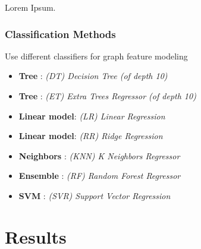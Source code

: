 \documentclass{article} %
\begin{document}
Lorem Ipsum.

\subsubsection{Classification Methods}

Use different classifiers for graph feature modeling


\begin{itemize}
	\item \textbf{Tree} \hspace{3.5pc}: \textit{(DT) Decision Tree (of depth 10)}
	\item \textbf{Tree} \hspace{3.5pc}: \textit{(ET) Extra Trees Regressor (of depth 10)}
 	\item \textbf{Linear model}\hspace{0.5pc}: \textit{(LR) Linear Regression}
	\item \textbf{Linear model}\hspace{0.5pc}: \textit{(RR) Ridge Regression}
	\item \textbf{Neighbors} \hspace{1.125pc} : \textit{(KNN) K Neighbors Regressor}
	\item \textbf{Ensemble}\hspace{1.5pc} : \textit{(RF) Random Forest Regressor}
	\item \textbf{SVM} \hspace{3pc} : \textit{(SVR) Support Vector Regression}
\end{itemize}



\section{Results}
\end{document}
